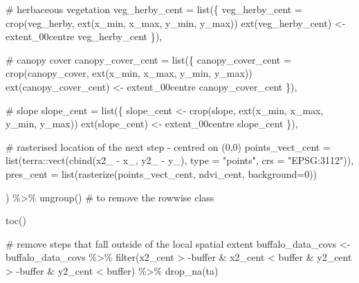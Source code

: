 \documentclass[
  letterpaper,
  DIV=11,
  numbers=noendperiod]{scrartcl}
\newenvironment{Shaded}{\begin{snugshade}}{\end{snugshade}}
\newcommand{\AttributeTok}[1]{\textcolor[rgb]{0.40,0.45,0.13}{#1}}
\newcommand{\CommentTok}[1]{\textcolor[rgb]{0.37,0.37,0.37}{#1}}
\newcommand{\DecValTok}[1]{\textcolor[rgb]{0.68,0.00,0.00}{#1}}
\newcommand{\FunctionTok}[1]{\textcolor[rgb]{0.28,0.35,0.67}{#1}}
\newcommand{\NormalTok}[1]{\textcolor[rgb]{0.00,0.23,0.31}{#1}}
\newcommand{\OtherTok}[1]{\textcolor[rgb]{0.00,0.23,0.31}{#1}}
\newcommand{\SpecialCharTok}[1]{\textcolor[rgb]{0.37,0.37,0.37}{#1}}
\newcommand{\StringTok}[1]{\textcolor[rgb]{0.13,0.47,0.30}{#1}}
\begin{document}
\begin{Shaded}
\begin{Highlighting}[]
    \CommentTok{\# herbaceous vegetation}
    \AttributeTok{veg\_herby\_cent =} \FunctionTok{list}\NormalTok{(\{}
\NormalTok{      veg\_herby\_cent }\OtherTok{=} \FunctionTok{crop}\NormalTok{(veg\_herby, }\FunctionTok{ext}\NormalTok{(x\_min, x\_max, y\_min, y\_max))}
      \FunctionTok{ext}\NormalTok{(veg\_herby\_cent) }\OtherTok{\textless{}{-}}\NormalTok{ extent\_00centre}
\NormalTok{      veg\_herby\_cent}
\NormalTok{      \}),}

    \CommentTok{\# canopy cover}
    \AttributeTok{canopy\_cover\_cent =} \FunctionTok{list}\NormalTok{(\{}
\NormalTok{      canopy\_cover\_cent }\OtherTok{=} \FunctionTok{crop}\NormalTok{(canopy\_cover, }\FunctionTok{ext}\NormalTok{(x\_min, x\_max, y\_min, y\_max))}
      \FunctionTok{ext}\NormalTok{(canopy\_cover\_cent) }\OtherTok{\textless{}{-}}\NormalTok{ extent\_00centre}
\NormalTok{      canopy\_cover\_cent}
\NormalTok{      \}),}

    \CommentTok{\# slope}
    \AttributeTok{slope\_cent =} \FunctionTok{list}\NormalTok{(\{}
\NormalTok{      slope\_cent }\OtherTok{\textless{}{-}} \FunctionTok{crop}\NormalTok{(slope, }\FunctionTok{ext}\NormalTok{(x\_min, x\_max, y\_min, y\_max))}
      \FunctionTok{ext}\NormalTok{(slope\_cent) }\OtherTok{\textless{}{-}}\NormalTok{ extent\_00centre}
\NormalTok{      slope\_cent}
\NormalTok{      \}),}

    \CommentTok{\# rasterised location of the next step {-} centred on (0,0)}
    \AttributeTok{points\_vect\_cent =} \FunctionTok{list}\NormalTok{(terra}\SpecialCharTok{::}\FunctionTok{vect}\NormalTok{(}\FunctionTok{cbind}\NormalTok{(x2\_ }\SpecialCharTok{{-}}\NormalTok{ x\_, y2\_ }\SpecialCharTok{{-}}\NormalTok{ y\_), }\AttributeTok{type =} \StringTok{"points"}\NormalTok{, }\AttributeTok{crs =} \StringTok{"EPSG:3112"}\NormalTok{)),}
    \AttributeTok{pres\_cent =} \FunctionTok{list}\NormalTok{(}\FunctionTok{rasterize}\NormalTok{(points\_vect\_cent, ndvi\_cent, }\AttributeTok{background=}\DecValTok{0}\NormalTok{))}

\NormalTok{  ) }\SpecialCharTok{\%\textgreater{}\%} \FunctionTok{ungroup}\NormalTok{() }\CommentTok{\# to remove the \textquotesingle{}rowwise\textquotesingle{} class}


  \FunctionTok{toc}\NormalTok{()}

  \CommentTok{\# remove steps that fall outside of the local spatial extent}
\NormalTok{  buffalo\_data\_covs }\OtherTok{\textless{}{-}}\NormalTok{ buffalo\_data\_covs }\SpecialCharTok{\%\textgreater{}\%}
    \FunctionTok{filter}\NormalTok{(x2\_cent }\SpecialCharTok{\textgreater{}} \SpecialCharTok{{-}}\NormalTok{buffer }\SpecialCharTok{\&}\NormalTok{ x2\_cent }\SpecialCharTok{\textless{}}\NormalTok{ buffer }\SpecialCharTok{\&}\NormalTok{ y2\_cent }\SpecialCharTok{\textgreater{}} \SpecialCharTok{{-}}\NormalTok{buffer }\SpecialCharTok{\&}\NormalTok{ y2\_cent }\SpecialCharTok{\textless{}}\NormalTok{ buffer) }\SpecialCharTok{\%\textgreater{}\%}
    \FunctionTok{drop\_na}\NormalTok{(ta)}


\end{Highlighting}
\end{Shaded}
\end{document}
